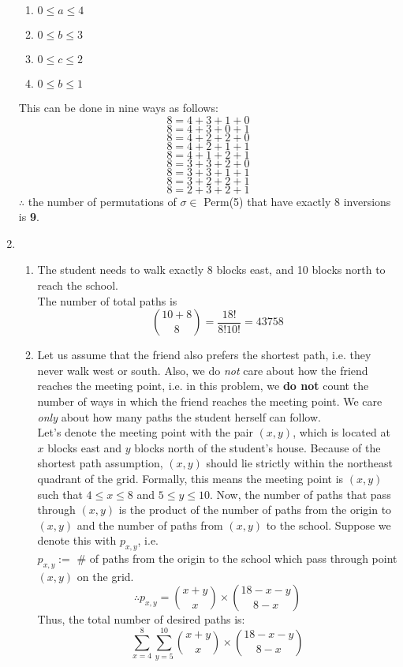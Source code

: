 \documentclass[a4paper,12pt]{article} %
\begin{document}
\begin{enumerate}
	\begin{enumerate}
		\item $0 \leq a \leq 4$
		\item $0 \leq b \leq 3$
		\item $0 \leq c \leq 2$
		\item $0 \leq b \leq 1$
	\end{enumerate}
	This can be done in nine ways as follows:
	$$8 = 4+3+1+0$$
	$$8 = 4+3+0+1$$
	$$8 = 4+2+2+0$$
	$$8 = 4+2+1+1$$
	$$8 = 4+1+2+1$$
	$$8 = 3+3+2+0$$
	$$8 = 3+3+1+1$$
	$$8 = 3+2+2+1$$
	$$8 = 2+3+2+1$$
	$\therefore$ the number of permutations of $\sigma \in$ Perm(5) that have exactly 8 inversions is \textbf{9}.
\item
	\begin{enumerate}
	\item The student needs to walk exactly 8 blocks east, and 10 blocks north to reach the school.\\
	The number of total paths is
	$$
	\binom{10 + 8}{8} = \frac{18!}{8!10!} = 43758
	$$
	\item Let us assume that the friend also prefers the shortest path, i.e. they never walk west or south. Also, we do \textit{not} care about how the friend reaches the meeting point, i.e. in this problem, we \textbf{do not} count the number of ways in which the friend reaches the meeting point. We care \textit{only} about how many paths the student herself can follow.\\
	Let's denote the meeting point with the pair $(x, y)$, which is located at $x$ blocks east and $y$ blocks north of the student's house.
	Because of the shortest path assumption, $(x, y)$ should lie strictly within the northeast quadrant of the grid. Formally, this means the meeting point is $(x, y)$ such that $4 \leq x \leq 8$ and $5 \leq y \leq 10$.
	Now, the number of paths that pass through $(x, y)$ is the product of the number of paths from the origin to $(x, y)$ and the number of paths from $(x, y)$ to the school. Suppose we denote this with $p_{x,y}$, i.e.\\
	$p_{x, y} := $ \# of paths from the origin to the school which pass through point $(x, y)$ on the grid.\\
	$$\therefore p_{x, y} = \binom{x+y}{x} \times \binom{18-x-y}{8-x}$$
	Thus, the total number of desired paths is:
	$$ \sum_{x=4}^{8}\sum_{y=5}^{10}\binom{x+y}{x} \times \binom{18-x-y}{8-x} $$
	\end{enumerate}


\end{enumerate}
\end{document}
